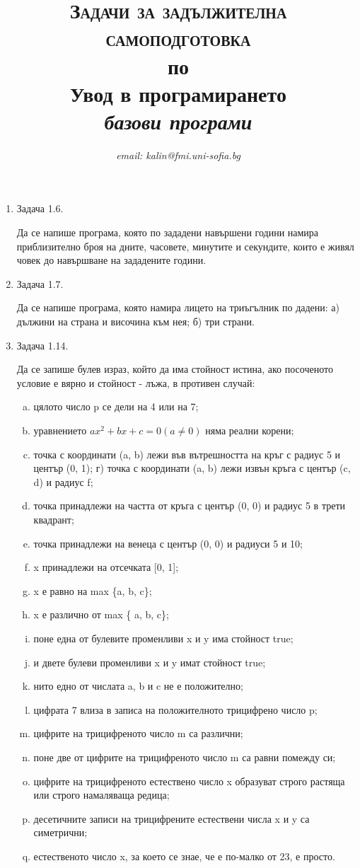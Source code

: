\documentclass[12pt,a4paper]{article}
\author{\textit{email: kalin@fmi.uni-sofia.bg}}
\title{\textsc{Задачи за задължителна самоподготовка} \\
по \\
Увод в програмирането\\
\textit{базови програми}}
\begin{document}
\maketitle


\begin{enumerate}
	\item Задача 1.6.

	Да се напише програма, която по зададени навършени години намира приблизително броя на дните, часовете, минутите и секундите, които е живял човек до навършване на зададените години.

	\item Задача 1.7.

	 Да се напише програма, която намира лицето на триъгълник по дадени: а) дължини на страна и височина към нея; б) три страни.

	 \item Задача 1.14.

	 Да се запише булев израз, който да има стойност истина, ако посоченото условие е вярно и стойност - лъжа, в противен случай:


	 \begin{enumerate}[a)] %
		\item цялото число p се дели на 4 или на 7;
		\item уравнението $ax^2 + bx + c = 0 (a \neq 0)$ няма реални корени;
		\item точка с координати (a, b) лежи във вътрешността на кръг с радиус 5 и център (0, 1); г) точка с координати (a, b) лежи извън кръга с център (c, d) и радиус f;
		\item точка принадлежи на частта от кръга с център (0, 0) и радиус 5 в трети квадрант;
		\item точка принадлежи на венеца с център (0, 0) и радиуси 5 и 10;
		\item x принадлежи на отсечката [0, 1];
		\item x е равно на max \{a, b, c\};
		\item x е различно от max \{ a, b, c\};
		\item поне една от булевите променливи x и y има стойност true;
		\item и двете булеви променливи x и y имат стойност true;
		\item нито едно от числата a, b и c не е положително;
		\item цифрата 7 влиза в записа на положителното трицифрено число p;
		\item цифрите на трицифреното число m са различни;
		\item поне две от цифрите на трицифреното число m са равни помежду си;
		\item цифрите на трицифреното естествено число x образуват строго растяща или строго намаляваща редица;
		\item десетичните записи на трицифрените естествени числа x и y са симетрични;
		\item естественото число x, за което се знае, че е по-малко от 23, е просто.


\end{enumerate}
\end{enumerate}
\end{document}
